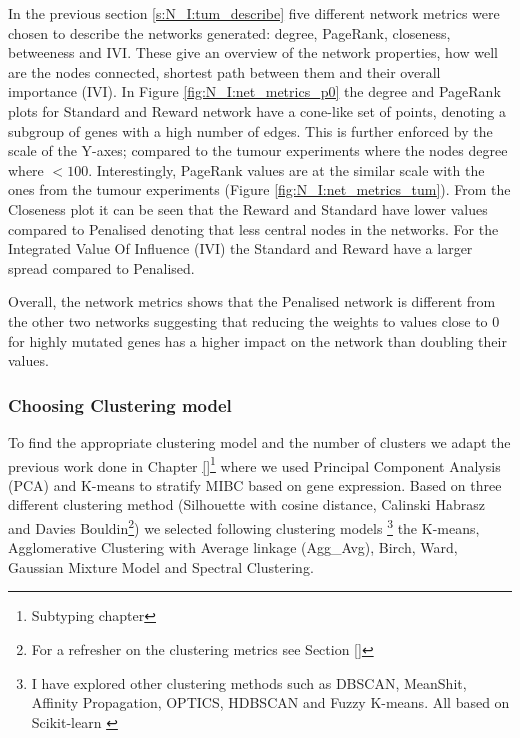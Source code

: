In the previous section \ref{s:N_I:tum_describe} five different network metrics were chosen to describe the networks generated: degree, PageRank, closeness, betweeness and IVI. These give an overview of the network properties, how well are the nodes connected, shortest path between them and their overall importance (IVI). In Figure \ref{fig:N_I:net_metrics_p0} the degree and PageRank plots for Standard and Reward network have a cone-like set of points, denoting a subgroup of genes with a high number of edges. This is further enforced by the scale of the Y-axes; compared to the tumour experiments where the nodes degree where $<100$. Interestingly, PageRank values are at the similar scale with the ones from the tumour experiments (Figure \ref{fig:N_I:net_metrics_tum}). From the Closeness plot it can be seen that the Reward and Standard have lower values compared to Penalised denoting that less central nodes in the networks. For the Integrated Value Of Influence (IVI) the Standard and Reward have a larger spread compared to Penalised. 

Overall, the network metrics shows that the Penalised network is different from the other two networks suggesting that reducing the weights to values close to 0 for highly mutated genes has a higher impact on the network than doubling their values.

\subsubsection{Choosing Clustering model} \label{s:p0:clustering_analysis}

To find the appropriate clustering model and the number of clusters we adapt the previous work done in Chapter \ref{}\footnote{Subtyping chapter} where we used Principal Component Analysis (PCA) and K-means to stratify MIBC based on gene expression. Based on three different clustering method (Silhouette with cosine distance, Calinski Habrasz and Davies Bouldin\footnote{For a refresher on the clustering metrics see Section \ref{}}) we selected following clustering models \footnote{I have explored other clustering methods such as DBSCAN, MeanShit, Affinity Propagation, OPTICS, HDBSCAN and Fuzzy K-means. All based on Scikit-learn \cite{Scikit-learn_undated-ax}} the K-means, Agglomerative Clustering with Average linkage (Agg\_Avg), Birch, Ward, Gaussian Mixture Model and Spectral Clustering. 

